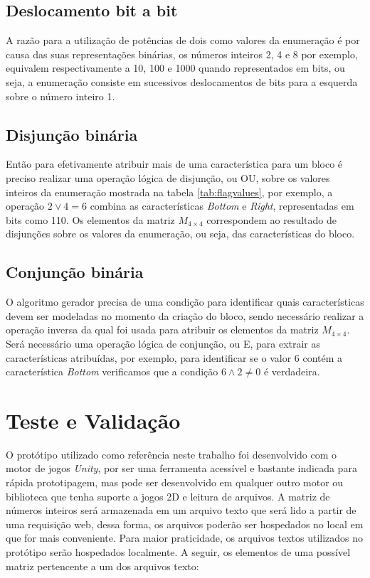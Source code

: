 \documentclass[10pt, conference, compsocconf]{IEEEtran}
\begin{document}
\subsection{Deslocamento bit a bit}

A razão para a utilização de potências de dois como valores da enumeração é por causa das suas representações binárias, os números inteiros 2, 4 e 8 por exemplo, equivalem respectivamente a 10, 100 e 1000 quando representados em bits, ou seja, a enumeração consiste em sucessivos deslocamentos de bits para a esquerda sobre o número inteiro 1.

\subsection{Disjunção binária}

Então para efetivamente atribuir mais de uma característica para um bloco é preciso realizar uma operação lógica de disjunção, ou OU, sobre os valores inteiros da enumeração  mostrada na tabela \ref{tab:flagvalues}, por exemplo, a operação $2 \lor 4 = 6$ combina as características \textit{Bottom} e \textit{Right}, representadas em bits como 110. Os elementos da matriz $M_{4 \times 4}$ correspondem ao resultado de disjunções sobre os valores da enumeração, ou seja, das características do bloco.

\subsection{Conjunção binária}

O algoritmo gerador precisa de uma condição para identificar quais características devem ser modeladas no momento da criação do bloco, sendo necessário realizar a operação inversa da qual foi usada para atribuir os elementos da matriz $M_{4 \times 4}$. Será necessário uma operação lógica de conjunção, ou E, para extrair as características atribuídas, por exemplo, para identificar se o valor 6 contém a característica \textit{Bottom} verificamos que a condição $6 \land 2 \neq 0$ é verdadeira.

\section{Teste e Validação}
\label{sec:testing-and-validation}

O protótipo utilizado como referência neste trabalho foi desenvolvido com o motor de jogos \textit{Unity}, por ser uma ferramenta acessível e bastante indicada para rápida prototipagem, mas pode ser desenvolvido em qualquer outro motor ou biblioteca que tenha suporte a jogos 2D e leitura de arquivos. A matriz de números inteiros será armazenada em um arquivo texto que será lido a partir de uma requisição web, dessa forma, os arquivos poderão ser hospedados no local em que for mais conveniente. Para maior praticidade, os arquivos textos utilizados no protótipo serão hospedados localmente. A seguir, os elementos de uma possível matriz pertencente a um dos arquivos texto:
\end{document}
